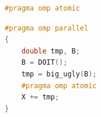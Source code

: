 \begin{openmpbox}
    \begin{lstlisting}[language=C++]
#pragma omp atomic\end{lstlisting}
\end{openmpbox}

\begin{examplebox}
    \begin{lstlisting}[language=C++]
#pragma omp parallel
{
    double tmp, B;
    B = DOIT();
    tmp = big_ugly(B);
    #pragma omp atomic
    X += tmp;
}
    \end{lstlisting}
\end{examplebox}